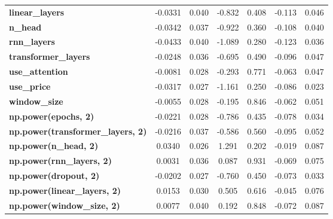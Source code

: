 \begin{center}
\begin{tabular}{lcccccc}
\textbf{linear\_layers}                   &      -0.0331  &        0.040     &    -0.832  &         0.408        &       -0.113    &        0.046     \\
\textbf{n\_head}                          &      -0.0342  &        0.037     &    -0.922  &         0.360        &       -0.108    &        0.040     \\
\textbf{rnn\_layers}                      &      -0.0433  &        0.040     &    -1.089  &         0.280        &       -0.123    &        0.036     \\
\textbf{transformer\_layers}              &      -0.0248  &        0.036     &    -0.695  &         0.490        &       -0.096    &        0.047     \\
\textbf{use\_attention}                   &      -0.0081  &        0.028     &    -0.293  &         0.771        &       -0.063    &        0.047     \\
\textbf{use\_price}                       &      -0.0317  &        0.027     &    -1.161  &         0.250        &       -0.086    &        0.023     \\
\textbf{window\_size}                     &      -0.0055  &        0.028     &    -0.195  &         0.846        &       -0.062    &        0.051     \\
\textbf{np.power(epochs, 2)}              &      -0.0221  &        0.028     &    -0.786  &         0.435        &       -0.078    &        0.034     \\
\textbf{np.power(transformer\_layers, 2)} &      -0.0216  &        0.037     &    -0.586  &         0.560        &       -0.095    &        0.052     \\
\textbf{np.power(n\_head, 2)}             &       0.0340  &        0.026     &     1.291  &         0.202        &       -0.019    &        0.087     \\
\textbf{np.power(rnn\_layers, 2)}         &       0.0031  &        0.036     &     0.087  &         0.931        &       -0.069    &        0.075     \\
\textbf{np.power(dropout, 2)}             &      -0.0202  &        0.027     &    -0.760  &         0.450        &       -0.073    &        0.033     \\
\textbf{np.power(linear\_layers, 2)}      &       0.0153  &        0.030     &     0.505  &         0.616        &       -0.045    &        0.076     \\
\textbf{np.power(window\_size, 2)}        &       0.0077  &        0.040     &     0.192  &         0.848        &       -0.072    &        0.087     \\

\end{tabular}
\end{center}
